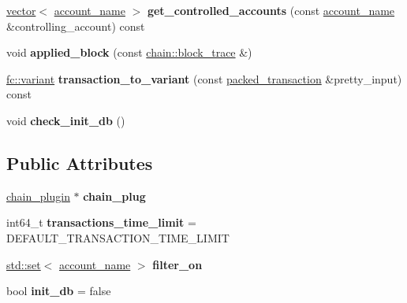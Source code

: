 \begin{DoxyCompactItemize}
\item 
\mbox{\label{classaacio_1_1account__history__plugin__impl_afb5c167903003018e456b7d681ead077}} 
\mbox{\hyperlink{classstd_1_1vector}{vector}}$<$ \mbox{\hyperlink{structaacio_1_1chain_1_1name}{account\+\_\+name}} $>$ {\bfseries get\+\_\+controlled\+\_\+accounts} (const \mbox{\hyperlink{structaacio_1_1chain_1_1name}{account\+\_\+name}} \&controlling\+\_\+account) const
\item 
\mbox{\label{classaacio_1_1account__history__plugin__impl_a81dc8ad02c74ee74148f03e4da3f0e10}} 
void {\bfseries applied\+\_\+block} (const \mbox{\hyperlink{structaacio_1_1chain_1_1block__trace}{chain\+::block\+\_\+trace}} \&)
\item 
\mbox{\label{classaacio_1_1account__history__plugin__impl_a110d0c45653b91385a0e3efe28720eed}} 
\mbox{\hyperlink{classfc_1_1variant}{fc\+::variant}} {\bfseries transaction\+\_\+to\+\_\+variant} (const \mbox{\hyperlink{structaacio_1_1chain_1_1packed__transaction}{packed\+\_\+transaction}} \&pretty\+\_\+input) const
\item 
\mbox{\label{classaacio_1_1account__history__plugin__impl_a99960bff86bfd53334e50ab4dfa76451}} 
void {\bfseries check\+\_\+init\+\_\+db} ()
\end{DoxyCompactItemize}
\subsection*{Public Attributes}
\begin{DoxyCompactItemize}
\item 
\mbox{\label{classaacio_1_1account__history__plugin__impl_a4b75cf0b7539fca401284de446af2039}} 
\mbox{\hyperlink{classaacio_1_1chain__plugin}{chain\+\_\+plugin}} $\ast$ {\bfseries chain\+\_\+plug}
\item 
\mbox{\label{classaacio_1_1account__history__plugin__impl_a8c36bbcd5a834ff7682cf17b9be04fed}} 
int64\+\_\+t {\bfseries transactions\+\_\+time\+\_\+limit} = D\+E\+F\+A\+U\+L\+T\+\_\+\+T\+R\+A\+N\+S\+A\+C\+T\+I\+O\+N\+\_\+\+T\+I\+M\+E\+\_\+\+L\+I\+M\+IT
\item 
\mbox{\label{classaacio_1_1account__history__plugin__impl_ac658d7eebfa152bda5591598eca7054f}} 
\mbox{\hyperlink{classstd_1_1set}{std\+::set}}$<$ \mbox{\hyperlink{structaacio_1_1chain_1_1name}{account\+\_\+name}} $>$ {\bfseries filter\+\_\+on}
\item 
\mbox{\label{classaacio_1_1account__history__plugin__impl_a09e4ea0ee1db179af925d6442d56b32b}} 
bool {\bfseries init\+\_\+db} = false
\end{DoxyCompactItemize}
